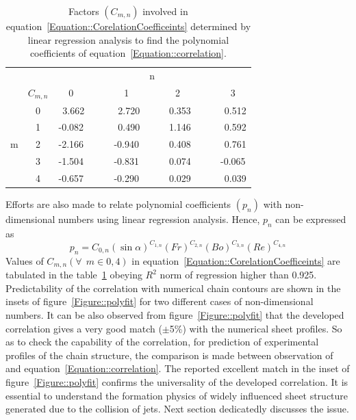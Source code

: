 \begin{table}
	\centering
	\caption{Factors $\left(C_{m,n}\right)$ involved in equation~\ref{Equation::CorelationCoefficeints} determined by linear regression analysis to find the polynomial coefficients of equation~\ref{Equation::correlation}.}
	\label{Table::polyfit}
	\begin{tabular}{@{}cc|ccccccccc@{}}
		&   &     &   & & &n &      &    &   &        \\
		& $C_{m,n}$  & 0 &   &  & 1 &      & 2 & &   & 3      \\\hline
		& 0 & ~3.662&  & & ~2.720&  & ~0.353& & & ~0.512  \\
		& 1  & -0.082 &&  & ~0.490  & & ~1.146& & & ~0.592  \\
		m& 2 & -2.166 & & & -0.940& & ~0.408& & & ~0.761  \\
		& 3 & -1.504& & & -0.831& & ~0.074& & & -0.065 \\
		& 4 & -0.657& & & -0.290& & ~0.029&& & ~0.039  \\ 
	\end{tabular}
\end{table}
Efforts are also made to relate polynomial coefficients $\left(p_n\right)$ with non-dimensional numbers using linear regression analysis. Hence, $p_n$ can be expressed as
\begin{equation}\label{Equation::CorelationCoefficeints}
p_n = C_{0,n}\left(\sin\alpha\right)^{C_{1,n}}\left(Fr\right)^{C_{2,n}}\left(Bo\right)^{C_{3,n}}\left(Re\right)^{C_{4,n}}
\end{equation}
Values of $C_{m,n} \left(\forall\:\: m \in {0,4}\right)$ in equation~\ref{Equation::CorelationCoefficeints} are tabulated in the table~\ref{Table::polyfit} obeying $R^2$ norm of regression higher than 0.925. Predictability of the correlation with numerical chain contours are shown in the insets of figure~\ref{Figure::polyfit} for two different cases of non-dimensional numbers. It can be also observed from figure~\ref{Figure::polyfit} that the developed correlation gives a very good match ($\pm$5\%) with the numerical sheet profiles. So as to check the capability of the correlation, for prediction of experimental profiles of the chain structure, the comparison is made between observation of \cite{bush2004collision} and equation~\ref{Equation::correlation}. The reported excellent match in the inset of figure~\ref{Figure::polyfit} confirms the universality of the developed correlation. It is essential to understand the formation physics of widely influenced sheet structure generated due to the collision of jets. Next section dedicatedly discusses the issue.
